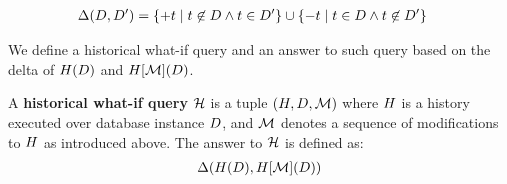   \begin{align*}
    \Delta(D,D') &=
\{ +t \mid t \not\in D \wedge t \in D' \} \cup \{ -t \mid t \in D \wedge t \not\in D' \}
  \end{align*}

  We define a historical what-if query and an answer to such query based on the delta of $H(D)$ and $H[\mathcal{M}](D)$.

\begin{defi}
A \textbf{historical what-if query} $\mathcal{H}$ is a tuple $(H, D, \mathcal{M})$ where $H$ is a  history executed over database instance $D$, and $\mathcal{M}$ denotes a sequence of modifications to $H$ as introduced above. %
The answer to $\mathcal{H}$ is defined as:
\begin{align*}
  \Delta(H(D),H[\mathcal{M}](D))
  \end{align*}
\end{defi}


